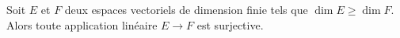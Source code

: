 Soit $E$ et $F$ deux espaces vectoriels de dimension finie tels que $\dim E \geq \dim F$. Alors toute application linéaire $E \to F$ est surjective.

\begin{reponses}
\end{reponses}

